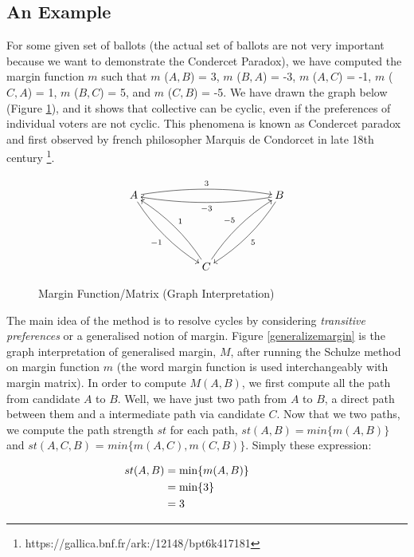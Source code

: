 	\subsection{An Example}
	For some given set of ballots (the actual set of ballots are not very important because we want to demonstrate the Condercet Paradox), we have computed 
	the margin function $m$ such that $m$ ($A, B$) = 3, $m$ ($B, A$) = -3, $m$ ($A, C$) = -1, 
	$m$ ($C, A$) = 1, $m$ ($B, C$) = 5, and $m$ ($C, B$) = -5. We have drawn the graph below (Figure \ref{marginfn}), and 
	it shows that collective can be cyclic, even if the preferences of individual voters are not cyclic. This phenomena 
	is known as Condercet paradox and first observed by french philosopher Marquis de Condorcet in late 18th century \footnote{https://gallica.bnf.fr/ark:/12148/bpt6k417181}.
	   
	   

 \begin{figure}[h]
\[
\xymatrix@R=12ex@C=12ex{
A \ar@/^/[rr]^{3} \ar@/_/[dr]_{-1} & & B \ar@/^/[ll]^{-3}
\ar@/^/[dl]^5 \\
& C \ar@/_/[ul]_{1} \ar@/^/[ur]^{-5}
}\]

\caption{Margin Function/Matrix (Graph Interpretation)}\label{marginfn}
\end{figure}  


The main idea of the method is to resolve cycles by considering \emph{transitive preferences} or a generalised notion of margin. 
Figure \ref{generalizemargin} is the graph interpretation of generalised 
margin, $M$, after running the Schulze method on margin function $m$ (the 
word margin function is used interchangeably with margin matrix).  In order to 
compute $M(A, B)$, we first compute all the path from candidate $A$ to $B$. Well, we have just two path from $A$ to $B$, a direct path between them and 
a intermediate path via candidate $C$.  Now that we two paths, we compute the path strength $st$ for each path, $st(A, B) = min \lbrace m (A, B) \rbrace $ 
and $st (A, C, B)$ = $min \lbrace m (A, C), m (C, B) \rbrace$.  Simply these expression:

\begin{align}
\hspace{-3cm} st (A, B)&=  \min \lbrace m (A, B) \rbrace  \nonumber \\
					  &= \min \lbrace 3 \rbrace \nonumber \\
                     &= 3 \nonumber
\end{align}


